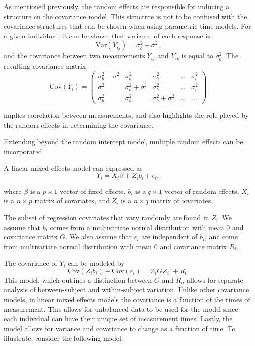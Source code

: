 \documentclass[12pt, twoside]{amherstthesis}
\begin{document}
As mentioned previously, the random effects are responsible for inducing a structure on the covariance model. This structure is not to be confused with the covariance structures that can be chosen when using parametric time models. For a given individual, it can be shown that variance of each response is:
\[\text{Var}(Y_{ij}) = \sigma^2_b + \sigma^2,\] and the covariance between two measurements \(Y_{ij}\) and \(Y_{ik}\) is equal to \(\sigma^2_b\). The resulting covariance matrix \[\text{Cov}(Y_i)=\begin{pmatrix} \sigma^2_b + \sigma^2 & \sigma^2_b & \sigma^2_b & ... & \sigma^2_b \\ \sigma^2 & \sigma^2_b + \sigma^2 & \sigma^2_b & ... & \sigma^2_b \\ \sigma^2_b & \sigma^2_b & \sigma^2_b + \sigma^2 & ...& ...   \end{pmatrix}\]

implies correlation between measurements, and also highlights the role played by the random effects in determining the covariance.

Extending beyond the random intercept model, multiple random effects can be incorporated.

A linear mixed effects model can expressed as \[Y_i = X_i\beta+Z_ib_i+\epsilon_i,\]

where \(\beta\) is a \(p \times 1\) vector of fixed effects,
\(b_i\) is a \(q \times 1\) vector of random effects,
\(X_i\) is a \(n \times p\) matrix of covariates, and
\(Z_i\) is a \(n \times q\) matrix of covariates.

The subset of regression covariates that vary randomly are found in \(Z_i\). We assume that \(b_i\) comes from a multivariate normal distribution with mean 0 and covariance matrix \(G\). We also assume that \(\epsilon_i\) are independent of \(b_i\), and come from multivariate normal distribution with mean 0 and covariance matrix \(R_i\).

The covariance of \(Y_i\) can be modeled by \[\text{Cov}(Z_ib_i) + \text{Cov}(\epsilon_i) = Z_iGZ_i' + R_i.\] This model, which outlines a distinction between \(G\) and \(R_i\), allows for separate analysis of between-subject and within-subject variation. Unlike other covariance models, in linear mixed effects models the covariance is a function of the times of measurement. This allows for unbalanced data to be used for the model since each individual can have their unique set of measurement times. Lastly, the model allows for variance and covariance to change as a function of time. To illustrate, consider the following model:
\end{document}

